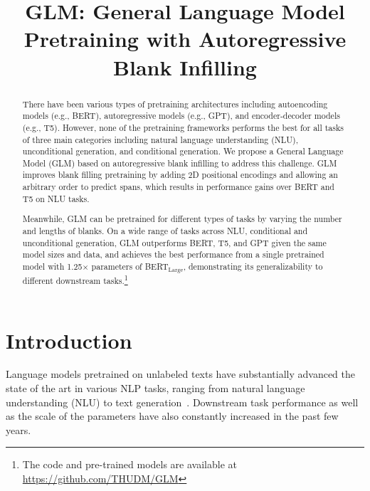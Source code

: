 \title{GLM: General Language Model Pretraining with Autoregressive Blank Infilling}

\begin{abstract}
There have been various types of pretraining architectures including autoencoding models (e.g., BERT), autoregressive models (e.g., GPT), and encoder-decoder models (e.g., T5). However, none of the pretraining frameworks performs the best for all tasks of three main categories including natural language understanding (NLU), unconditional generation, and conditional generation. We propose a General Language Model (GLM)  based on autoregressive blank infilling to address this challenge. GLM improves blank filling pretraining by adding 2D positional encodings and allowing an arbitrary order to predict spans, which results in performance gains over BERT and T5 on NLU tasks. 

Meanwhile, GLM can be pretrained for different types of tasks by varying the number and lengths of blanks. On a wide range of tasks across NLU, conditional and unconditional generation, GLM outperforms BERT, T5, and GPT given the same model sizes and data, and achieves the best performance from a single pretrained model with 1.25$\times$ parameters of BERT$_\text{Large}$, demonstrating its generalizability to different downstream tasks.\footnote{The code and pre-trained models are available at \url{https://github.com/THUDM/GLM}}
\end{abstract}

\section{Introduction}
\label{sec:intro}
Language models pretrained on unlabeled texts have substantially advanced the state of the art in various NLP tasks, ranging from natural language understanding (NLU) to text generation~\cite{GPT2018a,devlinBERT2019,YangXLNet2019,GPT2-2018,raffelT52020,lewisBART2019,GPT3-2020}. Downstream task performance as well as the scale of the parameters have also constantly increased in the past few years.

